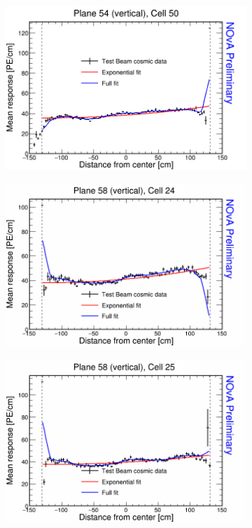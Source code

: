 \begin{figure}[h]
  \begin{subfigure}{0.5\textwidth}
    \includegraphics[width=\linewidth]{RelativeCalibrationResults/p2_054_050.png}
  \end{subfigure}
  \begin{subfigure}{0.5\textwidth}
    \includegraphics[width=\linewidth]{RelativeCalibrationResults/p2_058_024.png}
  \end{subfigure}
  \begin{subfigure}{0.5\textwidth}
    \includegraphics[width=\linewidth]{RelativeCalibrationResults/p2_058_025.png}

\end{subfigure}
\end{figure}
